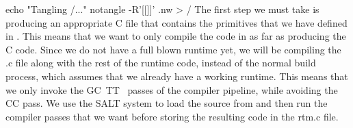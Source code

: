 \documentclass{article}%
\begin{document}
\nwenddocs{}\plusendmoddef\nwstartdeflinemarkup{}\nwenddeflinemarkup
echo "Tangling /..."
notangle -R'[[]]' .nw > /
\eatline
{}\nwendcode{}\nwdocspar
The first step we must take is producing an appropriate C file that
contains the primitives that we have defined in {\Tt{}\nwendquote}.
This means that we want to only compile the code in {\Tt{}\nwendquote}
as far as producing the C code.
Since we do not have a full blown runtime yet,
we will be compiling the {\Tt{}.c\nwendquote} file along with the rest of the
runtime code,
instead of the normal build process,
which assumes that we already have a working runtime.
This means that we only invoke the {\Tt{}GC\ TT\ \nwendquote} passes of the
compiler pipeline, while avoiding the {\Tt{}CC\nwendquote} pass.
We use the SALT system to load the source from {\Tt{}\nwendquote} and then
run the compiler passes that we want before storing the resulting
code in the {\Tt{}rtm{\nwbackslash}.c\nwendquote} file.
\end{document}
